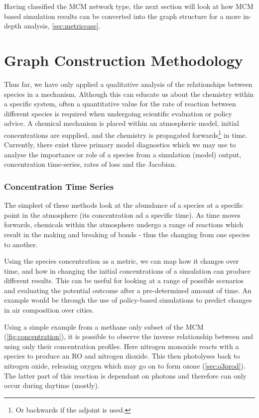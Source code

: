 Having classified the MCM network type, the next section will look at how MCM based simulation results can be converted into the graph structure for a more in-depth analysis, \autoref{sec:metriccase}.


\section{Graph Construction Methodology }\label{sec:chem}

Thus far, we have only applied a qualitative analysis of the relationships between species in a mechanism. Although this can educate us about the chemistry within a specific system, often a quantitative value for the rate of reaction between different species is required when undergoing scientific evaluation or policy advice. A chemical mechanism is placed within an atmospheric model, initial concentrations are supplied, and the chemistry is propagated forwards\footnote{Or backwards if the adjoint is used.} in time. Currently, there exist three primary model diagnostics which we may use to analyse the importance or role of a species from a simulation (model) output, concentration time-series, rates of loss and the Jacobian.


\subsubsection{Concentration Time Series}

The simplest of these methods look at the abundance of a  species at a specific point in the atmosphere (its concentration ad a specific time). As time moves forwards, chemicals within the atmosphere undergo a range of reactions which result in the making and breaking of bonds - thus the changing from one species to another.

Using the species concentration as a metric, we can map how it changes over time, and how in changing the initial concentrations of a simulation can produce different results. This can be useful for looking at a range of possible scenarios and evaluating the potential outcome after a pre-determined amount of time. An example would be through the use of policy-based simulations to predict changes in air composition over cities.

Using a simple example from a methane only subset of the MCM (\autoref{fig:concentration}), it is possible to observe the inverse relationship between  and  using only their concentration profiles. Here nitrogen monoxide reacts with a  species to produce an RO and nitrogen dioxide.
This then photolyses back to nitrogen oxide, releasing oxygen which may go on to form ozone (\autoref{sec:o3prod}). The latter part of this reaction is dependant on photons and therefore can only occur during daytime (mostly).

